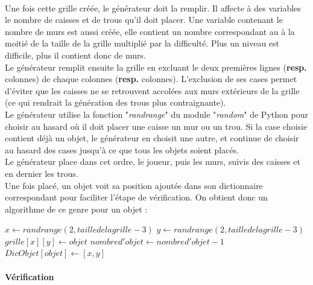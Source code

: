 \documentclass[a4paper,12pt]{article}
\begin{document}
\paragraph{}
Une fois cette grille créée, le générateur doit la remplir. Il affecte à des variables le nombre de caisses et de trous qu'il doit placer. Une variable contenant le nombre de murs est aussi créée, elle contient un nombre correspondant au à la moitié de la taille de la grille multiplié par la difficulté. Plus un niveau est difficile, plus il contient donc de murs.\\
Le générateur remplit ensuite la grille en excluant le deux premières lignes (\textbf{resp.} colonnes) de chaque colonnes (\textbf{resp.} colonnes). L'exclusion de ses cases permet d'éviter que les caisses ne se retrouvent accolées aux murs extérieurs de la grille (ce qui rendrait la génération des trous plus contraignante).\\
Le générateur utilise la fonction "\textit{randrange}" du module "\textit{random}" de Python pour choisir au hasard où il doit placer une caisse un mur ou un trou. Si la case choisie contient déjà un objet, le générateur en choisit une autre, et continue de choisir au hasard des cases jusqu'à ce que tous les objets soient placés.\\
Le générateur place dans cet ordre, le joueur, puis les murs, suivis des caisses et en dernier les trous.\\
Une fois placé, un objet voit sa position ajoutée dans son dictionnaire correspondant pour faciliter l'étape de vérification.
On obtient donc un algorithme de ce genre pour un objet :\\
\begin{algorithmic}
    \State $x\gets randrange(2,tailledelagrille -3)$
    \State $y\gets randrange(2,tailledelagrille -3)$
        \State $grille[x][y] \gets objet$
        \State $nombred'objet \gets nombred'objet - 1 $
        \State $DicObjet[objet] \gets [x,y]$
    \EndIf
\EndWhile
\end{algorithmic}
\paragraph{Vérification}
\end{document}

